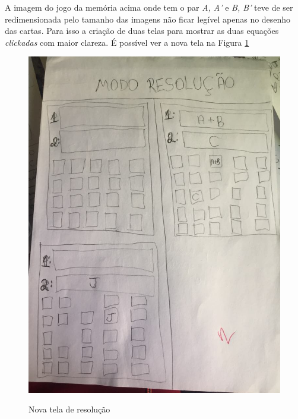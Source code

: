 A imagem do jogo da memória acima onde tem o par \textit{A, A'} e \textit{B, B'} teve de ser redimensionada pelo tamanho das imagens não ficar legível apenas no desenho das cartas. Para isso a criação de duas telas para mostrar as duas equações \textit{clickadas} com maior clareza. É possível ver a nova tela na Figura \ref{prot3}

\begin{figure}[H]
\centering
\caption{Nova tela de resolução}
\includegraphics[scale=0.53]{figuras/prot3.jpg}
\label{prot3}
\end{figure}


